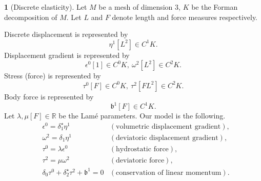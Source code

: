 \documentclass[fleqn]{article}
\theoremstyle{definition}
\newtheorem{discussion}[theorem]{}
\newcommand{\R}{\mathbb{R}}
\begin{document}
\begin{discussion}[Discrete elasticity]
  Let $M$ be a mesh of dimension $3$, $K$ be the Forman decomposition of $M$.
  Let $L$ and $F$ denote length and force measures respectively.
  
  Discrete displacement is represented by
  \begin{equation}
    \eta^1 [L^2] \in C^1 K.
  \end{equation}
  Displacement gradient is represented by
  \begin{equation}
    \epsilon^0 [1] \in C^0 K,\ \omega^2 [L^2] \in C^2 K.
  \end{equation}
  Stress (force) is represented by
  \begin{equation}
    \tau^0 [F] \in C^0 K,\ \tau^2 [F L^2] \in C^2 K.
  \end{equation}
  Body force is represented by
  \begin{equation}
    \mathfrak{b}^1 [F] \in C^1 K.
  \end{equation}
  Let $\lambda, \mu [F] \in \R$ be the Lam{\'e} parameters.
  Our model is the following.
  \begin{subequations}
    \begin{align}
      & \epsilon^0 = \delta_1^\star \eta^1
      & (\text{volumetric displacement gradient}), \\
      & \omega^2 = \delta_1 \eta^1 
      & (\text{deviatoric displacement gradient}), \\
      & \tau^0 = \lambda \epsilon^0
      & (\text{hydrostatic force}), \\
      & \tau^2 = \mu \omega^2
      & (\text{deviatoric force}), \\
      & \delta_0 \tau^0 + \delta_2^\star \tau^2 + \mathfrak{b}^1 = 0
      & (\text{conservation of linear momentum}).
    \end{align}
  \end{subequations}
\end{discussion}
\end{document}
